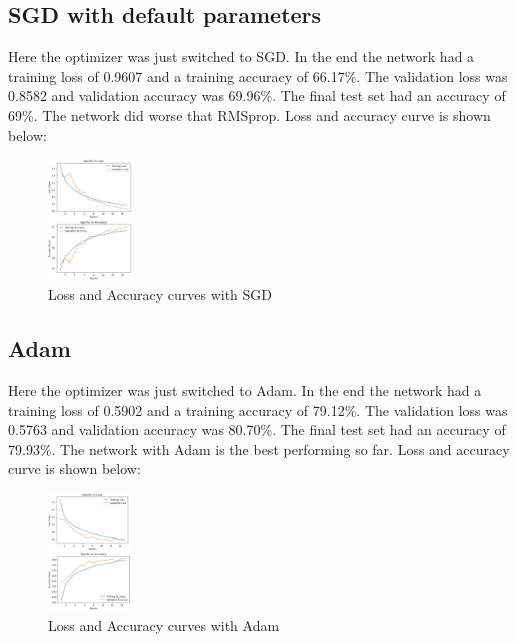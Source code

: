 \documentclass[conference]{IEEEtran}
\begin{document}
    \subsection{SGD with default parameters}

    Here the optimizer was just switched to SGD. In the end the network had a training loss of
    0.9607 and a training accuracy of 66.17\%. The validation loss was 0.8582 and validation accuracy was 69.96\%. The final test set had
    an accuracy of 69\%. The network did worse that RMSprop. Loss and accuracy curve is shown below:

    \begin{figure}[H]
        \centering
        \captionsetup{justification=centering}
        \centering
            \includegraphics[width=0.2\textwidth]{15.png}
            \caption{Loss and Accuracy curves with SGD}
    \end{figure}

    \subsection{Adam}

    Here the optimizer was just switched to Adam. In the end the network had a training loss of
    0.5902 and a training accuracy of 79.12\%. The validation loss was 0.5763 and validation accuracy was 80.70\%. The final test set had
    an accuracy of 79.93\%. The network with Adam is the best performing so far. Loss and accuracy curve is shown below:

    \begin{figure}[H]
        \centering
        \captionsetup{justification=centering}
        \centering
            \includegraphics[width=0.2\textwidth]{16.png}
            \caption{Loss and Accuracy curves with Adam}
    \end{figure}
\end{document}
